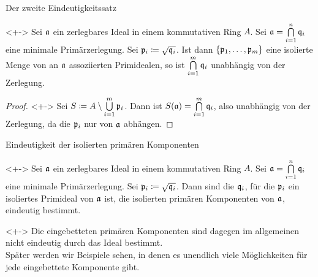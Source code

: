 \begin{frame}{Der zweite Eindeutigkeitssatz}
	\begin{theorem}<+->
		\label{thm:second_uniqueness}
		Sei \(\mathfrak{a}\) ein zerlegbares Ideal in einem kommutativen
		Ring \(A\). Sei \(\mathfrak{a} = \bigcap\limits_{i = 1}^n \mathfrak{q}_i\)
		eine minimale Primärzerlegung. Sei \(\mathfrak{p}_i \coloneqq
		\sqrt{\mathfrak{q}_i}\). Ist dann \(\{\mathfrak{p}_1, \dots, \mathfrak{p}_m\}\)
		eine isolierte Menge von an \(\mathfrak{a}\) assoziierten Primidealen,
		so ist \(\bigcap\limits_{i = 1}^m \mathfrak{q}_i\) unabhängig von der
		Zerlegung.
	\end{theorem}
	\begin{proof}<+->
		Sei \(S \coloneqq A \setminus \bigcup\limits_{i = 1}^m \mathfrak{p}_i\).
		Dann ist \(S(\mathfrak{a}) = \bigcap\limits_{i = 1}^m \mathfrak{q}_i\), also
		unabhängig von der Zerlegung, da die \(\mathfrak{p}_i\) nur von
		\(\mathfrak{a}\) abhängen.
	\end{proof}
\end{frame}

\begin{frame}{Eindeutigkeit der isolierten primären Komponenten}
	\begin{corollary}<+->
		\label{cor:second_uniqueness}
		Sei \(\mathfrak{a}\) ein zerlegbares Ideal in einem kommutativen
		Ring \(A\). Sei \(\mathfrak{a} = \bigcap\limits_{i = 1}^n \mathfrak{q}_i\)
		eine minimale Primärzerlegung. Sei \(\mathfrak{p}_i \coloneqq
		\sqrt{\mathfrak{q}_i}\). Dann sind die \(\mathfrak{q}_i\), für die \(\mathfrak{p}_i\)
		ein isoliertes Primideal von \(\mathfrak{a}\) ist, die \alert{isolierten
		primären Komponenten von \(\mathfrak{a}\)}, eindeutig bestimmt.
	\end{corollary}
	\begin{remark}<+->
		Die eingebetteten primären Komponenten sind dagegen im allgemeinen nicht
		eindeutig durch das Ideal bestimmt.
		\\
		Später werden wir Beispiele sehen, in denen es unendlich viele
		Möglichkeiten für jede eingebettete Komponente gibt.
	\end{remark}
\end{frame}

